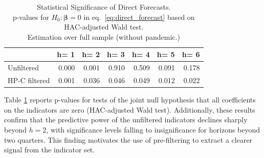\documentclass[11pt,a4paper]{article}
\begin{document}
\bigskip
\begin{table}[h]
\caption{Statistical Significance of Direct Forecasts.\\
p-values for $H_0: \boldsymbol{\beta} = 0$ in eq.~\eqref{eq:direct_forecast} based on HAC-adjusted Wald test.\\Estimation over full sample (without pandemic.)} 
\label{tab:pvaluedhp}
\centering
\begin{tabular}{lrrrrrr}
  \hline
  & h= 1 & h= 2 & h= 3 & h= 4 & h= 5 & h= 6 \\ 
  \hline
  Unfiltered & 0.000 & 0.001 & 0.910 & 0.509 & 0.091 & 0.178 \\ 
HP-C filtered & 0.001 & 0.036 & 0.046 & 0.049 & 0.012 & 0.022 \\ 
   \hline
\end{tabular}

\end{table}


Table \ref{tab:pvaluedhp} reports p-values for tests of the joint null hypothesis that all coefficients on the indicators are zero (HAC-adjusted Wald test). 
Additionally, these results confirm that the predictive power of the unfiltered indicators declines sharply beyond $h=2$, with significance levels falling to insignificance for horizons beyond two quarters.%
 This finding motivates the use of pre-filtering to extract a clearer signal from the indicator set.
\end{document}

